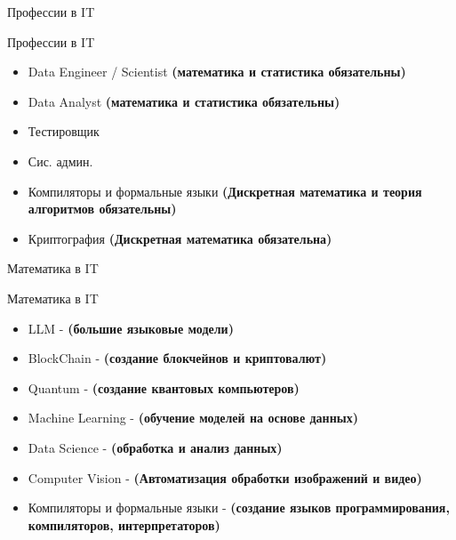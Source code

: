 \documentclass{beamer}
\begin{document}
\begin{section}{Профессии в IT}
\begin{frame}{Профессии в IT}
\begin{itemize}
\begin{itemize}
            \end{itemize}
            \item Data Engineer / Scientist  \textbf{(математика и статистика обязательны)}
            \item Data Analyst  \textbf{(математика и статистика обязательны)}
            \item Тестировщик 
            \item Сис. админ. 
            \item Компиляторы и формальные языки \textbf{(Дискретная математика и теория алгоритмов обязательны)}
            \item Криптография \textbf{(Дискретная математика обязательна)}
        \end{itemize}
    \end{frame}

    \begin{section}{Математика в IT}
        \begin{frame}{Математика в IT}
            \begin{itemize}
                \item LLM - \textbf{(большие языковые модели)}
                \item BlockChain - \textbf{(создание блокчейнов и криптовалют)}
                \item Quantum - \textbf{(создание квантовых компьютеров)}
                \item Machine Learning - \textbf{(обучение моделей на основе данных)}
                \item Data Science - \textbf{(обработка и анализ данных)}
                \item Computer Vision - \textbf{(Автоматизация обработки изображений и видео)} 
                \item Компиляторы и формальные языки - \textbf{(создание языков программирования, компиляторов, интерпретаторов)}
            \end{itemize}
        \end{frame}
    \end{section}


\end{section}
\end{document}
